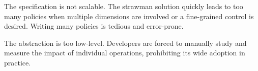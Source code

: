 
The specification is not scalable. The strawman solution quickly leads to too
many policies when multiple dimensions are involved or a fine-grained control is
desired. Writing many policies is tedious and error-prone.

The abstraction is too low-level. Developers are forced to manually study and
measure the impact of individual operations, prohibiting its wide adoption in
practice.


